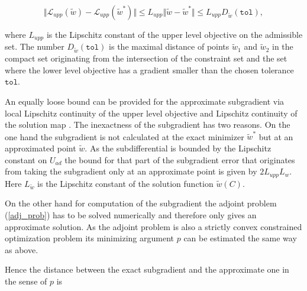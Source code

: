 \[ \Vert \mathcal{L}_{upp}(\tilde{w})-\mathcal{L}_{upp}(\tilde{w}^*) \Vert \leq L_{upp}\Vert \tilde{w}-\tilde{w}^* \Vert \leq  L_{upp} D_{\tilde{w}}(\mathtt{tol}), \]

where \(  L_{upp}\) is the Lipschitz constant of the upper level objective on the admissible set. The number \(D_{\tilde{w}}(\mathtt{tol})\) is the maximal distance of points \(\tilde{w}_1\) and \(\tilde{w}_2\) in the compact set originating from the intersection of the constraint set and the set where the lower level objective has a gradient smaller than the chosen tolerance \(\mathtt{tol}\). 
%
%

An equally loose bound can be provided for the approximate subgradient via local Lipschitz continuity of the upper level objective and Lipschitz continuity of the solution map \cite[chapter 5]{Outrata1998}.
The inexactness of the subgradient has two reasons. On the one hand the subgradient is not calculated at the exact minimizer \(\tilde{w}^*\) but at an approximated point \(\tilde{w}\).
As the subdifferential is bounded by the Lipschitz constant on \(U_{ad}\) the bound for that part of the subgradient error that originates from taking the subgradient only at an approximate point is given by \(2L_{upp}L_{w}\). Here \(L_{\tilde{w}}\) is the Lipschitz constant of the solution function \(\tilde{w}(C)\).




On the other hand for computation of the subgradient the adjoint problem (\ref{adj_prob}) has to be solved numerically and therefore only gives an approximate solution.
As the adjoint problem is also a strictly convex constrained optimization problem its minimizing argument \(p\) can be estimated the same way as above.

Hence the distance between the exact subgradient and the approximate one in the sense of \(p\) is

